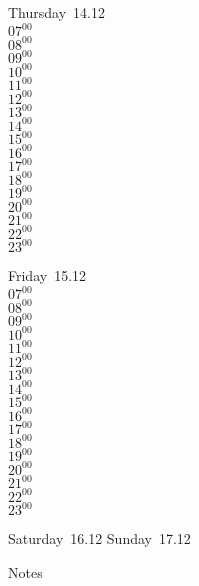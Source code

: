 \documentclass[11pt, a4paper]{book}\usepackage[]{graphicx}\usepackage[]{color}
\begin{document}
\begin{weekdaybox}
  Thursday~14.12\\
  { 
  \vfill
  $07^{00}$\\
$08^{00}$\\
$09^{00}$\\
$10^{00}$\\
$11^{00}$\\
$12^{00}$\\
$13^{00}$\\
$14^{00}$\\
$15^{00}$\\
$16^{00}$\\
$17^{00}$\\
$18^{00}$\\
$19^{00}$\\
$20^{00}$\\
$21^{00}$\\
$22^{00}$\\
$23^{00}$\\
  }
\end{weekdaybox} 
\begin{weekdaybox}
  Friday~15.12\\
  { 
  \vfill
  $07^{00}$\\
$08^{00}$\\
$09^{00}$\\
$10^{00}$\\
$11^{00}$\\
$12^{00}$\\
$13^{00}$\\
$14^{00}$\\
$15^{00}$\\
$16^{00}$\\
$17^{00}$\\
$18^{00}$\\
$19^{00}$\\
$20^{00}$\\
$21^{00}$\\
$22^{00}$\\
$23^{00}$\\
  }
\end{weekdaybox}
\begin{weekendbox}
  Saturday~16.12
  \tcblower
  Sunday~17.12
\end{weekendbox} %
\begin{notebox}
  Notes
\end{notebox}
\clearpage
\end{document}
